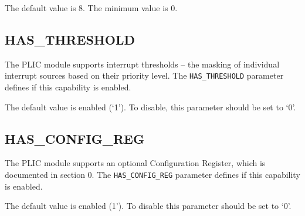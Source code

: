 The default value is 8. The minimum value is 0.

\subsection{HAS\_THRESHOLD}

The PLIC module supports interrupt thresholds -- the masking of
individual interrupt sources based on their priority level. The
\texttt{HAS\_THRESHOLD} parameter defines if this capability is enabled.

The default value is enabled (`1'). To disable, this parameter should be
set to `0'.

\subsection{HAS\_CONFIG\_REG}

The PLIC module supports an optional Configuration Register, which is
documented in section 0. The \texttt{HAS\_CONFIG\_REG} parameter defines
if this capability is enabled.

The default value is enabled (1'). To disable this parameter should be
set to `0'.
